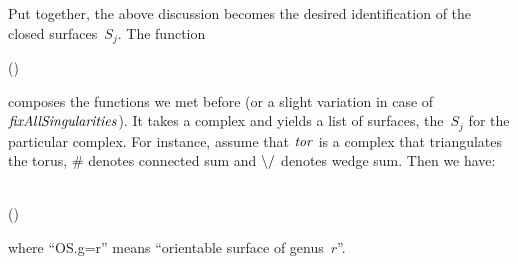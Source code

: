 Put together, the above discussion becomes the desired identification of the
closed surfaces~$S_j$. The function
\begin{hscode}\SaveRestoreHook
{}%
%
\>[B]{}\mathbin{::}(\;)\Rightarrow {}\;\<[E]%
\\
\>[B]{}\mathrel{=}\;\mathbin{\circ}\mathbin{\circ}\<[E]%
\ColumnHook
\end{hscode}\resethooks
composes the functions we met before (or a slight variation in case of
\ensuremath{\Varid{fixAllSingularities}}). It takes a complex and yields a list of surfaces,
the~$S_j$ for the particular complex. For instance, assume that \ensuremath{\Varid{tor}} is a
complex that triangulates the torus, \ensuremath{\mathbin{\#}} denotes connected sum and \ensuremath{\mathbin{\char92 /}}
denotes wedge sum. Then we have:\begin{hscode}\SaveRestoreHook
{}%
%
%
%
\>[3]{}\;\<[38]%
\>[38]{}\qquad\mbox{\onelinecomment   [OS.g=1]}{}\<[E]%
\\
\>[3]{}\mathbin{\$}(\mathbin{\#})\<[38]%
\>[38]{}\qquad\mbox{\onelinecomment   [OS.g=2,OS.g=1]}{}\<[E]%
\ColumnHook
\end{hscode}\resethooks
where \enquote{OS.g=r} means \enquote{orientable surface of genus~$r$}.

